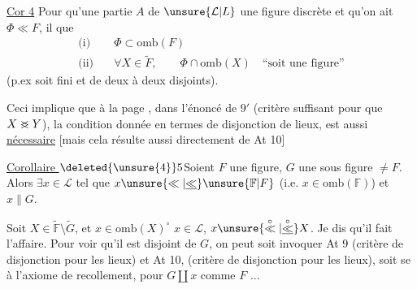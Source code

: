 \uline{Cor 4}\quad {} Pour qu'une partie $A$ de
$\unsure{\mathcal L|L}$  une figure discrète\inserted{$\unsure{\Phi|\varphi}$} et qu'on
ait $\Phi\ll F$, il  que
\[
\begin{aligned}
\text{(i)}\quad &\Phi\subset\mathrm{omb}(F)\\
\text{(ii)}\quad &\forall X\in\widetilde F,\qquad \Phi\cap\mathrm{omb}(X)\quad \text{``soit une figure''}
\end{aligned}
\]
(p.ex soit fini et  de   deux à deux
disjoints).

Ceci implique  que à la
page , dans l'énoncé de  $9'$
(critère suffisant pour que $X\mathrel{\rlap{$<$}{>}}Y$), la
condition donnée  en termes
de disjonction de lieux, est aussi
\uline{nécessaire} [mais cela résulte aussi directement
de At 10]

\noindent\llap{\smash{\rule[-9.2\baselineskip]{0.4pt}{9.8\baselineskip}}\quad}%
\uline{Corollaire $\deleted{\unsure{4}}5$}\quad Soient $F$ une figure, $G$ une
\llap{\smash{\rule[-1.4\baselineskip]{0.4pt}{1.8\baselineskip}}\enspace}sous figure $\neq F$. Alors $\exists x\in\mathcal L$ tel que
$x\unsure{\ll|\underline{\ll}}\unsure{\mathbb F|F}$ (i.e. $x\in\mathrm{omb}(\mathbb F)$) et $x\parallel G$.

Soit $X\in\widetilde{\mathbb F}\setminus\widetilde G$, et $x\in\mathrm{omb}(X)^\circ$ 
 $x\in\mathcal L$, $x\unsure{\overset{\circ}{\ll}|\overset{\circ}{\underline{\ll}}}X$. Je dis qu'il fait l'affaire.
Pour voir qu'il est disjoint de $G$, on peut
soit invoquer At 9 (critère de disjonction pour les
lieux) et At 10, (critère de disjonction pour les lieux),
soit se  à  l'axiome de recollement, pour
 $G\amalg x$ comme  $F$ ...
